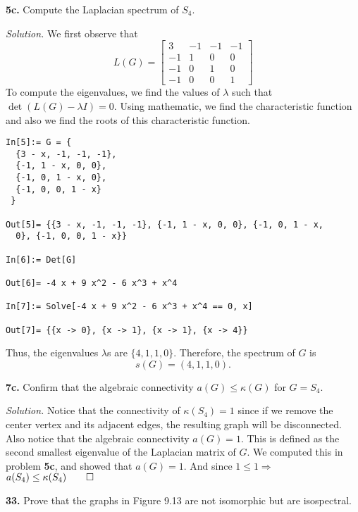\documentclass{article}
\begin{document}
\newpage
\textbf{5c.} Compute the Laplacian spectrum of \(S_4\). 

\vspace{4mm}
\textit{Solution.} We first observe that 
\[L(G)= 
\begin{bmatrix} 
3 & -1 & -1 & -1 \\
-1& 1 &0&0\\
-1&0&1&0\\
-1&0&0&1
\end{bmatrix}
\]
To compute the eigenvalues, we find the values of \(\lambda\) such that \(\det(L(G)-\lambda I)=0\). Using mathematic, we find the characteristic function and also we find the roots of this characteristic function. 
\begin{verbatim}
In[5]:= G = {
  {3 - x, -1, -1, -1},
  {-1, 1 - x, 0, 0},
  {-1, 0, 1 - x, 0},
  {-1, 0, 0, 1 - x}
 }

Out[5]= {{3 - x, -1, -1, -1}, {-1, 1 - x, 0, 0}, {-1, 0, 1 - x, 
  0}, {-1, 0, 0, 1 - x}}

In[6]:= Det[G]

Out[6]= -4 x + 9 x^2 - 6 x^3 + x^4

In[7]:= Solve[-4 x + 9 x^2 - 6 x^3 + x^4 == 0, x]

Out[7]= {{x -> 0}, {x -> 1}, {x -> 1}, {x -> 4}}
\end{verbatim}
Thus, the eigenvalues \(\lambda\)s are \(\{ 4,1,1,0\}\). Therefore, the spectrum of \(G\) is 
\[
s(G) = (4,1,1,0).
\]

\vspace{6mm}
\textbf{7c.} Confirm that the algebraic connectivity \(a(G)\leq \kappa(G) \) for \(G=S_4\). 

\vspace{3mm} 
\textit{Solution.} Notice that the connectivity of \(\kappa(S_4)=1\) since if we remove the center vertex and its adjacent edges, the resulting graph will be disconnected. Also notice that the algebraic connectivity \(a(G)=1\). This is defined as the second smallest eigenvalue of the Laplacian matrix of \(G\). We computed this in problem \textbf{5c}, and showed that \(a(G)=1\). And since \(1\leq1 \Rightarrow\) \(a(S_4) \leq \kappa(S_4) \qed\) 

\newpage
\textbf{33.} Prove that the graphs in Figure 9.13 are not isomorphic but are isospectral. 

\vspace{3mm}
\end{document}

